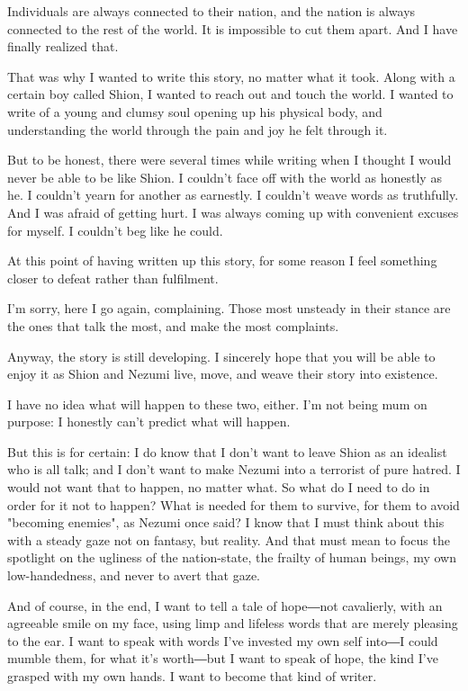 Individuals are always connected to their nation, and the nation is
always connected to the rest of the world. It is impossible to cut them
apart. And I have finally realized that.

That was why I wanted to write this story, no matter what it took. Along
with a certain boy called Shion, I wanted to reach out and touch the
world. I wanted to write of a young and clumsy soul opening up his
physical body, and understanding the world through the pain and joy he
felt through it.

But to be honest, there were several times while writing when I thought
I would never be able to be like Shion. I couldn't face off with the
world as honestly as he. I couldn't yearn for another as earnestly. I
couldn't weave words as truthfully. And I was afraid of getting hurt. I
was always coming up with convenient excuses for myself. I couldn't beg
like he could.

At this point of having written up this story, for some reason I feel
something closer to defeat rather than fulfilment.

I'm sorry, here I go again, complaining. Those most unsteady in their
stance are the ones that talk the most, and make the most complaints.

Anyway, the story is still developing. I sincerely hope that you will be
able to enjoy it as Shion and Nezumi live, move, and weave their story
into existence.

I have no idea what will happen to these two, either. I'm not being mum
on purpose: I honestly can't predict what will happen.

But this is for certain: I do know that I don't want to leave Shion as
an idealist who is all talk; and I don't want to make Nezumi into a
terrorist of pure hatred. I would not want that to happen, no matter
what. So what do I need to do in order for it not to happen? What is
needed for them to survive, for them to avoid "becoming enemies", as
Nezumi once said? I know that I must think about this with a steady gaze
not on fantasy, but reality. And that must mean to focus the spotlight
on the ugliness of the nation-state, the frailty of human beings, my own
low-handedness, and never to avert that gaze.

And of course, in the end, I want to tell a tale of hope―not cavalierly,
with an agreeable smile on my face, using limp and lifeless words that
are merely pleasing to the ear. I want to speak with words I've invested
my own self into―I could mumble them, for what it's worth―but I want to
speak of hope, the kind I've grasped with my own hands. I want to become
that kind of writer.

